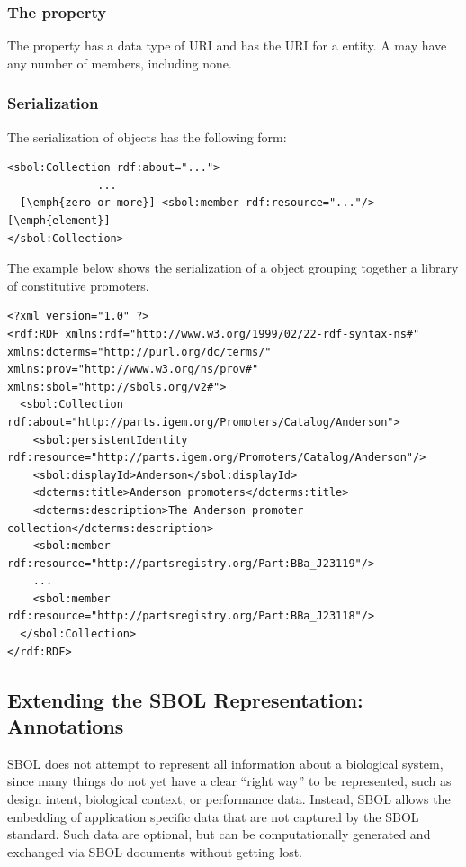 \subsubsection*{The  property}
The  property has a data type of URI and has the URI for a  entity.  A  may have any number of members, including none.

\subsubsection*{Serialization}

The serialization of  objects has the following form:

\begin{lstlisting}
<sbol:Collection rdf:about="...">
              ...
  [\emph{zero or more}] <sbol:member rdf:resource="..."/> [\emph{element}]
</sbol:Collection>
\end{lstlisting}

The example below shows the serialization of a  object grouping together a library of constitutive promoters.
\begin{lstlisting}
<?xml version="1.0" ?>
<rdf:RDF xmlns:rdf="http://www.w3.org/1999/02/22-rdf-syntax-ns#" xmlns:dcterms="http://purl.org/dc/terms/" xmlns:prov="http://www.w3.org/ns/prov#" xmlns:sbol="http://sbols.org/v2#">
  <sbol:Collection rdf:about="http://parts.igem.org/Promoters/Catalog/Anderson">
    <sbol:persistentIdentity rdf:resource="http://parts.igem.org/Promoters/Catalog/Anderson"/>
    <sbol:displayId>Anderson</sbol:displayId>
    <dcterms:title>Anderson promoters</dcterms:title>
    <dcterms:description>The Anderson promoter collection</dcterms:description>
    <sbol:member rdf:resource="http://partsregistry.org/Part:BBa_J23119"/>
    ...
    <sbol:member rdf:resource="http://partsregistry.org/Part:BBa_J23118"/>
  </sbol:Collection>
</rdf:RDF>
\end{lstlisting}
\label{ser:Collection}

\subsection{Extending the SBOL Representation:  Annotations}
\label{sec:Annotations}
\label{sec:annotations}


SBOL does not attempt to represent all information about a biological system, since many things do not yet have a clear ``right way'' to be represented, such as design intent, biological context, or performance data.  Instead, SBOL allows the embedding of application specific data that are not captured by the SBOL standard.  Such data are optional, but can be computationally generated and exchanged via SBOL documents without getting lost. 

